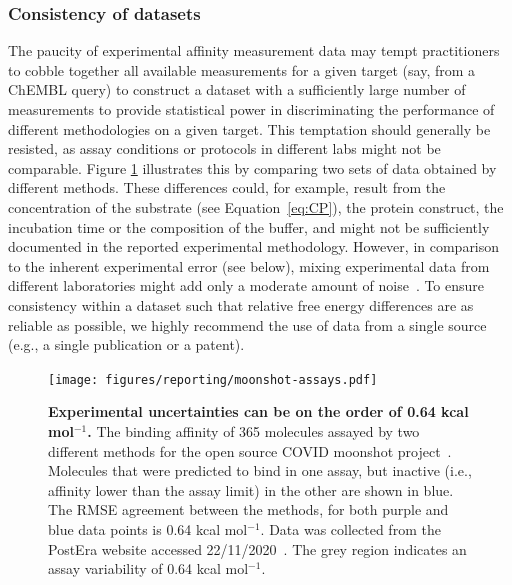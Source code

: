 \documentclass[9pt,bestpractices,pubversion]{livecoms}
\begin{document}
\subsubsection{Consistency of datasets}
The paucity of experimental affinity measurement data may tempt practitioners to cobble together all available measurements for a given target (say, from a ChEMBL query) to construct a dataset with a sufficiently large number of measurements to provide statistical power in discriminating the performance of different methodologies on a given target.
This temptation should generally be resisted, as assay conditions or protocols in different labs might not be comparable. Figure \ref{fig:expt_agreement} illustrates this by comparing two sets of data obtained by different methods.
% 
These differences could, for example, result from the concentration of the substrate (see Equation~\ref{eq:CP}), the protein construct, the incubation time or the composition of the buffer, and might not be sufficiently documented in the reported experimental methodology. However, in comparison to the inherent experimental error (see below), mixing experimental data from different laboratories might add only a moderate amount of noise~\cite{kalliokoski_comparability_2013}.
To ensure consistency within a dataset such that relative free energy differences are as reliable as possible, we highly recommend the use of data from a single source (e.g., a single publication or a patent).

\begin{figure}[!ht]
    \centering
    \texttt{[image: figures/reporting/moonshot-assays.pdf]}
    \caption{\textbf{Experimental uncertainties can be on the order of 0.64 kcal mol$^{-1}$.} The binding affinity of 365 molecules assayed by two different methods for the open source COVID moonshot project~\cite{achdout2020covid}. Molecules that were predicted to bind in one assay, but inactive (i.e., affinity lower than the assay limit) in the other are shown in blue. The RMSE agreement between the methods, for both purple and blue data points is 0.64 kcal mol$^{-1}$. Data was collected from the PostEra website accessed 22/11/2020~\cite{posteracovid}. The grey region indicates an assay variability of 0.64 kcal mol$^{-1}$.}
    \label{fig:expt_agreement}
\end{figure}
\end{document}
